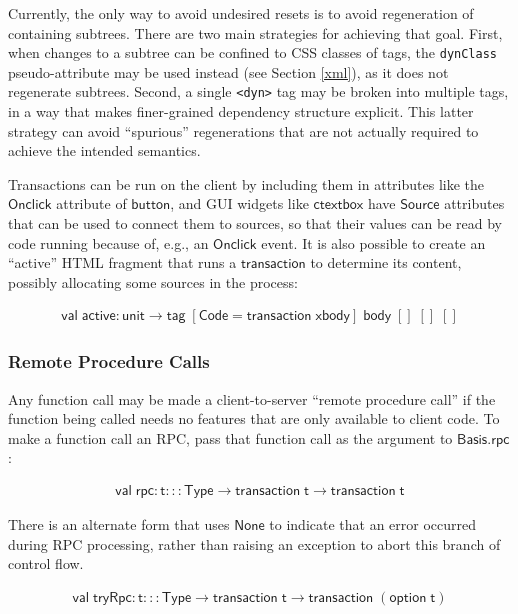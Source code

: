 \documentclass{article}
\newcommand{\cd}[1]{\texttt{#1}}
\newcommand{\mt}[1]{\mathsf{#1}}
\begin{document}
Currently, the only way to avoid undesired resets is to avoid regeneration of containing subtrees.  There are two main strategies for achieving that goal.  First, when changes to a subtree can be confined to CSS classes of tags, the \texttt{dynClass} pseudo-attribute may be used instead (see Section \ref{xml}), as it does not regenerate subtrees.  Second, a single \cd{<dyn>} tag may be broken into multiple tags, in a way that makes finer-grained dependency structure explicit.  This latter strategy can avoid ``spurious'' regenerations that are not actually required to achieve the intended semantics.

Transactions can be run on the client by including them in attributes like the $\mt{Onclick}$ attribute of $\mt{button}$, and GUI widgets like $\mt{ctextbox}$ have $\mt{Source}$ attributes that can be used to connect them to sources, so that their values can be read by code running because of, e.g., an $\mt{Onclick}$ event.  It is also possible to create an ``active'' HTML fragment that runs a $\mt{transaction}$ to determine its content, possibly allocating some sources in the process:

$$\begin{array}{l}
  \mt{val} \; \mt{active} : \mt{unit} \to \mt{tag} \; [\mt{Code} = \mt{transaction} \; \mt{xbody}] \; \mt{body} \; [] \; [] \; []
\end{array}$$

\subsubsection{\label{rpc}Remote Procedure Calls}

Any function call may be made a client-to-server ``remote procedure call'' if the function being called needs no features that are only available to client code.  To make a function call an RPC, pass that function call as the argument to $\mt{Basis.rpc}$:

$$\begin{array}{l}
  \mt{val} \; \mt{rpc} : \mt{t} ::: \mt{Type} \to \mt{transaction} \; \mt{t} \to \mt{transaction} \; \mt{t}
\end{array}$$

There is an alternate form that uses $\mt{None}$ to indicate that an error occurred during RPC processing, rather than raising an exception to abort this branch of control flow.

$$\begin{array}{l}
  \mt{val} \; \mt{tryRpc} : \mt{t} ::: \mt{Type} \to \mt{transaction} \; \mt{t} \to \mt{transaction} \; (\mt{option} \; \mt{t})
\end{array}$$
\end{document}
